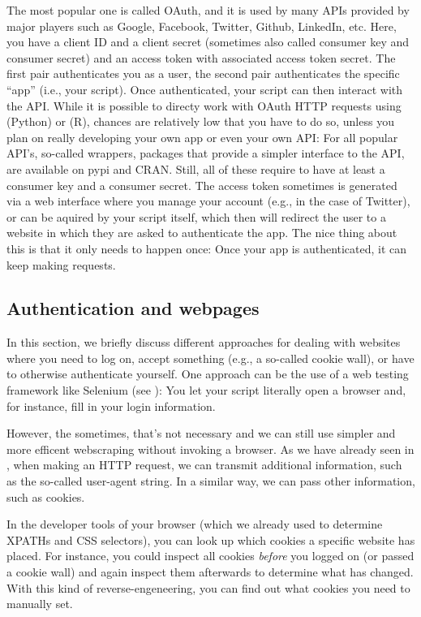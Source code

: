 The most popular one is called OAuth, and it is used by many APIs
provided by major players such as Google, Facebook, Twitter, Github,
LinkedIn, etc. Here, you have a client ID and a client secret
(sometimes also called consumer key and consumer secret) and an
access token with associated access token secret. The first pair
authenticates you as a user, the second pair authenticates the
specific ``app'' (i.e., your script). Once authenticated, your
script can then interact with the API. While it is possible to
directy work with OAuth HTTP requests using 
(Python) or  (R), chances are relatively low that you
have to do so, unless you plan on really developing your own app
or even your own API: For all popular API's, so-called wrappers,
packages that provide a simpler interface to the API, are available
on pypi and CRAN. Still, all of these require to have at least
a consumer key and a consumer secret. The access token sometimes
is generated via a web interface where you manage your account
(e.g., in the case of Twitter), or can be aquired by your script
itself, which then will redirect the user to a website in which
they are asked to authenticate the app. The nice thing about this
is that it only needs to happen once: Once your app is authenticated,
it can keep making requests.




\subsection{Authentication and webpages}
\label{sec:authweb}
In this section, we briefly discuss different approaches for dealing
with websites where you need to log on, accept something (e.g., a
so-called cookie wall), or have to otherwise authenticate yourself.
One approach can be the use of a web testing framework like Selenium
(see ): You let your script literally open a browser
and, for instance, fill in your login information.

However, the sometimes, that's not necessary and we can still use simpler
and more efficent webscraping without invoking a browser. As we have already
seen in , when making an HTTP request, we can transmit
additional information, such as the so-called user-agent string. In a
similar way, we can pass other information, such as cookies.

In the developer tools of your browser (which we already used to determine
XPATHs and CSS selectors), you can look up which cookies a specific website
has placed. For instance, you could inspect all cookies \emph{before} you
logged on (or passed a cookie wall) and again inspect them afterwards to
determine what has changed. With this kind of reverse-engeneering, you
can find out what cookies you need to manually set.

